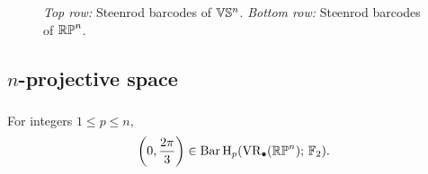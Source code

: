 \begin{figure}
	\centering
	
	\caption{\emph{Top row:} Steenrod barcodes of $\mathbb{V}\mathbb{S}^n$. \emph{Bottom row:} Steenrod barcodes of $\mathbb{RP}^n$.}
	\label{fig:sq barcodes}
\end{figure}

\subsection{$n$-projective space}

\subsubsection{}\label{prop:RPn bar}
\lemma For integers $1 \leq p \leq n$,
\[
\left(0, \frac{2\pi}{3}\right) \in \operatorname{Bar} \operatorname{H}_{p}(\operatorname{VR}_\bullet(\mathbb{RP}^n);\,{\mathbb{F}_2}).
\]

